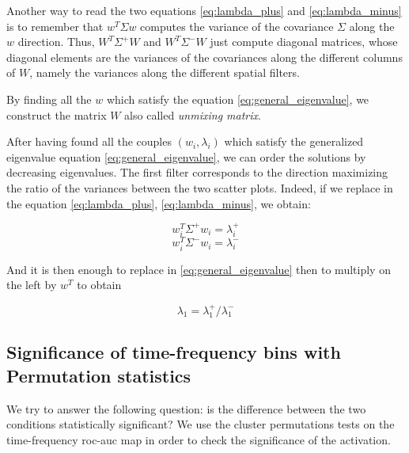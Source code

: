 Another way to read the two equations \ref{eq:lambda_plus} and \ref{eq:lambda_minus} is to remember that $w^{T}\Sigma w$ computes the variance of the covariance $\Sigma$ along the $w$ direction. Thus, $W^{T} \Sigma^{+} W$ and $W^{T} \Sigma^{-} W$ just compute diagonal matrices, whose diagonal elements are the variances of the covariances along the different columns of $W$, namely the variances along the different spatial filters.

By finding all the $w$ which satisfy the equation \ref{eq:general_eigenvalue}, we construct the matrix $W$ also called \textit{unmixing matrix}.

After having found all the couples $(w_i, \lambda_i)$ which satisfy the generalized eigenvalue equation \ref{eq:general_eigenvalue}, we can order the solutions by decreasing eigenvalues. The first filter corresponds to the direction maximizing the ratio of the variances between the two scatter plots. Indeed, if we replace in the equation \ref{eq:lambda_plus}, \ref{eq:lambda_minus}, we obtain:

\begin{equation}
    w^{T}_{i} \Sigma^{+} w_{i} = \lambda^{+}_{i}
    \label{eq:lambda_plus_first_component}
\end{equation}
\begin{equation}
    w^{T}_{i} \Sigma^{-} w_{i} = \lambda^{-}_{i}
    \label{eq:lambda_minus_first_component}
\end{equation}

And it is then enough to replace in \ref{eq:general_eigenvalue} then to multiply on the left by $w^{T}$ to obtain


\begin{equation}
    \lambda_1 = \lambda^{+}_1 / \lambda^{-}_1
\end{equation}


\subsection{Significance of time-frequency bins with Permutation statistics}

We try to answer the following question: is the difference between the two conditions statistically significant? We use the cluster permutations tests on the time-frequency roc-auc map in order to check the significance of the activation.

